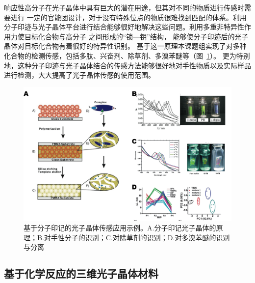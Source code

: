 响应性高分子在光子晶体中具有巨大的潜在用途，但其对不同的物质进行传感时需要进行
一定的官能团设计，对于没有特殊位点的物质很难找到匹配的体系。利用分子印迹与光子晶体平台进行结合能够很好地解决这些问题。利用多重非特异性作用力使目标化合物与高分子
之间形成的“锁—钥”结构，
能够使分子印迹后的光子晶体对目标化合物有着很好的特异性识别。
基于这一原理本课题组实现了对多种化合物的检测传感，包括多肽\cite{Hu2007Construction}、兴奋剂\cite{Hu2008Ultrasensitive}、除草剂\cite{Wu2008LabelFree}、多溴苯醚\cite{Xu2014LabelFree}等（图~\ref{fig:mol_imprint}）。
更为特别地，这种分子印迹与光子晶体结合的传感方法能够很好地对手性物质\cite{Hu2006Imprinted}以及实际样品\cite{Xu2014Molecularly}进行检测，大大提高了光子晶体传感的使用范围。
\begin{figure}[htbp]
	\centering
	\includegraphics[width=0.8\linewidth]{figures/mol-imprint.png}
	\caption{基于分子印记的光子晶体传感应用示例。A.分子印记光子晶体的原理；B.对手性分子的识别\cite{Hu2006Imprinted}；C.对除草剂的识别\cite{Wu2008LabelFree}；D.对多溴苯醚的识别与分离\cite{Xu2014LabelFree}}
	\label{fig:mol_imprint}
\end{figure}

\subsection{基于化学反应的三维光子晶体材料}
\label{subsec:chem-reaction}

